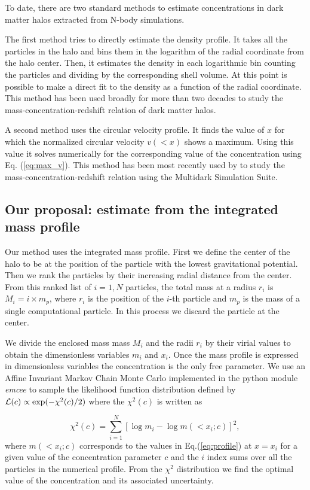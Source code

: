 \documentclass[a4,useAMS,usenatbib,usegraphicx]{mn2e}
\begin{document}
To date, there are two standard methods to estimate concentrations in
dark matter halos extracted from N-body simulations. 

The first method tries to directly estimate the density profile.  
It takes all the particles in the halo and bins them in the logarithm of
the radial coordinate from the halo center.  
Then, it estimates the density in each logarithmic bin counting the
particles and dividing by the corresponding shell volume.  
At this point is possible to make a direct fit to the density as a function of the radial coordinate.
This method has been used broadly for more than two decades to study
the mass-concentration-redshift relation of dark matter halos.
 
A second method uses the circular velocity profile.  
It finds the value of $x$ for which the normalized circular velocity
$v(<x)$ shows a maximum.  
Using this value it solves numerically for the corresponding value of
the concentration using Eq. (\ref{eq:max_v}). 
This method has been most recently used by \cite{Klypin2014} to study
the mass-concentration-redshift relation using the Multidark
Simulation Suite. 


\subsection{Our proposal: estimate from the integrated mass profile}

Our method uses the integrated mass profile.  
First we define the center of the halo to be at the position of the
particle with the lowest gravitational potential.  
Then we rank the particles by their increasing radial distance from
the center. 
From this ranked list of $i=1,N$ particles, the total mass at a radius
$r_i$ is $M_i=i\times m_p$, where $r_i$ is the position of the $i$-th
particle and $m_p$ is the mass of a single computational particle. In
this process we discard the particle at the center. 

We divide the enclosed mass mass $M_i$ and the radii $r_i$ by their
virial values to obtain the dimensionless variables $m_i$ and $x_i$.
Once the mass profile is expressed in dimensionless variables the
concentration is the only free parameter. 
We use an Affine Invariant Markov Chain Monte Carlo implemented in the
python module {\em emcee} \citep{emcee} to sample the likelihood
function distribution defined by ${\cal L}(c)\propto
\exp(-\chi^2(c)/2)$ where the $\chi^2(c)$ is 
written as

\begin{equation}
\chi^2(c)= \sum_{i=1}^{N}[\log m_i - \log m(< x_i;c)]^2,
\end{equation}
%
where $m(<x_i;c)$ corresponds to the values in Eq.(\ref{eq:profile})
at $x=x_i$ for a given value of the concentration parameter $c$ and
the $i$ index sums over all the particles in the numerical profile.
From the $\chi^2$ distribution we find the optimal value of the
concentration and its associated uncertainty.
\end{document}
